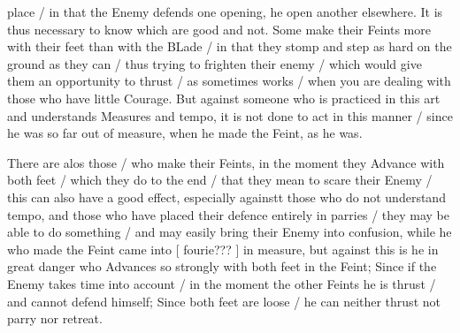 \newpage


\newpage



place / in that the Enemy defends one opening, he open another
elsewhere. It is thus necessary to know which are good and not. Some
make their Feints more with their feet than with the BLade / in that
they stomp and step as hard on the ground as they can / thus trying to
frighten their enemy / which would give them an opportunity to thrust
/ as sometimes works / when you are dealing with those who have little
Courage. But against someone who is practiced in this art and
understands Measures and tempo, it is not done to act in this manner /
since he was so far out of measure, when he made the Feint, as he was.


There are alos those / who make their Feints, in the moment they
Advance with both feet / which they do to the end / that they mean to
scare their Enemy / this can also have a good effect, especially
againstt those who do not understand tempo, and those who have placed
their defence entirely in parries / they may be able to do something /
and may easily bring their Enemy into confusion, while he who made the
Feint came into [ fourie??? ] in measure, but against this is he in
great danger who Advances so strongly with both feet in the Feint;
Since if the Enemy takes time into account / in the moment the other
Feints he is thrust / and cannot defend himself; Since both feet are
loose / he can neither thrust not parry nor retreat.

